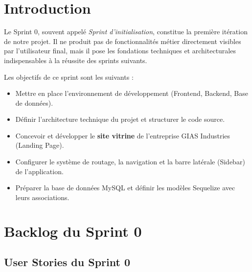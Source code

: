 
\section{Introduction}
Le Sprint 0, souvent appelé \textit{Sprint d'initialisation}, constitue la première itération de notre projet. Il ne produit pas de fonctionnalités métier directement visibles par l'utilisateur final, mais il pose les fondations techniques et architecturales indispensables à la réussite des sprints suivants.

Les objectifs de ce sprint sont les suivants :
\begin{itemize}
    \item Mettre en place l'environnement de développement (Frontend, Backend, Base de données).
    \item Définir l'architecture technique du projet et structurer le code source.
    \item Concevoir et développer le \textbf{site vitrine} de l'entreprise GIAS Industries (Landing Page).
    \item Configurer le système de routage, la navigation et la barre latérale (Sidebar) de l'application.
    \item Préparer la base de données MySQL et définir les modèles Sequelize avec leurs associations.
\end{itemize}

\section{Backlog du Sprint 0}

\subsection{User Stories du Sprint 0}

